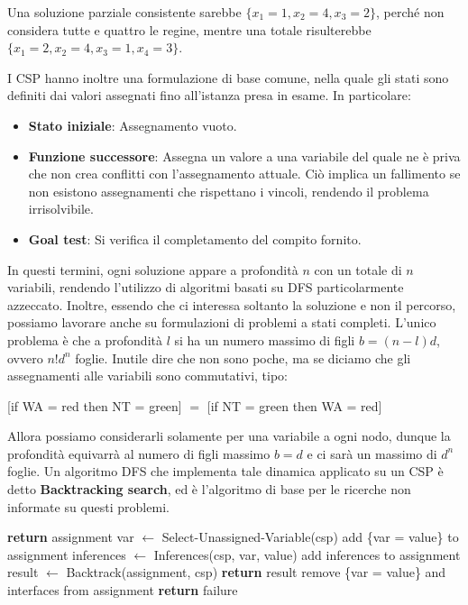 \noindent Una soluzione parziale consistente sarebbe $\{x_1 = 1, x_2 = 4, x_3 = 2\}$, perché non considera tutte e quattro le regine, mentre una totale
risulterebbe $\{x_1 = 2, x_2 = 4, x_3 = 1, x_4 = 3\}$.\par
I CSP hanno inoltre una formulazione di base comune, nella quale gli stati sono definiti dai valori assegnati fino all'istanza presa in esame. In
particolare: \begin{itemize}
	\item \textbf{Stato iniziale}: Assegnamento vuoto.
	\item \textbf{Funzione successore}: Assegna un valore a una variabile del quale ne è priva che non crea conflitti con l'assegnamento attuale. Ciò
        implica un fallimento se non esistono assegnamenti che rispettano i vincoli, rendendo il problema irrisolvibile.
	\item \textbf{Goal test}: Si verifica il completamento del compito fornito.
\end{itemize}

\noindent In questi termini, ogni soluzione appare a profondità $n$ con un totale di $n$ variabili, rendendo l'utilizzo di algoritmi basati su DFS
particolarmente azzeccato. Inoltre, essendo che ci interessa soltanto la soluzione e non il percorso, possiamo lavorare anche su formulazioni di
problemi a stati completi. L'unico problema è che a profondità $l$ si ha un numero massimo di figli $b = (n-l)d$, ovvero $n!d^n$ foglie. Inutile dire
che non sono poche, ma se diciamo che gli assegnamenti alle variabili sono commutativi, tipo: \begin{center}
	[if WA = red then NT = green] $=$ [if NT = green then WA = red]
\end{center}

\noindent Allora possiamo considerarli solamente per una variabile a ogni nodo, dunque la profondità equivarrà al numero di figli massimo $b = d$ e ci
sarà un massimo di $d^n$ foglie. Un algoritmo DFS che implementa tale dinamica applicato su un CSP è detto \textbf{Backtracking search}, ed è
l'algoritmo di base per le ricerche non informate su questi problemi.
\begin{algorithm}[h]
	\caption{Backtrack (assignment, csp) returns solution or failure}
	\begin{algorithmic}[i]
		 \textbf{return} assignment
		\EndIf
		\State var $\gets$ Select-Unassigned-Variable(csp)
				\State add \{var = value\} to assignment
				\State inferences $\gets$ Inferences(csp, var, value)
					\State add inferences to assignment
					\State result $\gets$ Backtrack(assignment, csp)
					 \textbf{return} result
					\EndIf
				\EndIf
			\EndIf
			\State remove \{var = value\} and interfaces from assignment
		\EndFor
		\textbf{return} failure
	\end{algorithmic}
\end{algorithm}

